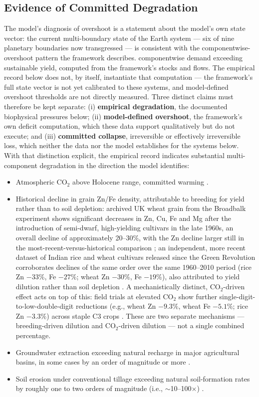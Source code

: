 \documentclass[twocolumn,10pt]{article}
\begin{document}
\subsection{Evidence of Committed Degradation}
\label{sec:evidence-of-committed-degradation}
The model's diagnosis of overshoot is a statement about the model's own state vector: the current multi-boundary state of the Earth system --- six of nine planetary boundaries now transgressed \cite{richardson2023} --- is consistent with the componentwise-overshoot pattern the framework describes. componentwise demand exceeding sustainable yield, computed from the framework's stocks and flows. The empirical record below does not, by itself, instantiate that computation --- the framework's full state vector is not yet calibrated to these systems, and model-defined overshoot thresholds are not directly measured. Three distinct claims must therefore be kept separate: (i) \textbf{empirical degradation}, the documented biophysical pressures below; (ii) \textbf{model-defined overshoot}, the framework's own deficit computation, which these data support qualitatively but do not execute; and (iii) \textbf{committed collapse}, irreversible or effectively irreversible loss, which neither the data nor the model establishes for the systems below. With that distinction explicit, the empirical record indicates substantial multi-component degradation in the direction the model identifies:
\begin{itemize}
\item Atmospheric CO\(_2\) above Holocene range, committed warming \cite{ipcc2021}.
\item Historical decline in grain Zn/Fe density, attributable to breeding for yield rather than to soil depletion: archived UK wheat grain from the Broadbalk experiment shows significant decreases in Zn, Cu, Fe and Mg after the introduction of semi-dwarf, high-yielding cultivars in the late 1960s, an overall decline of approximately 20--30\%, with the Zn decline larger still in the most-recent-versus-historical comparison \cite{fan2008}; an independent, more recent dataset of Indian rice and wheat cultivars released since the Green Revolution corroborates declines of the same order over the same 1960--2010 period (rice Zn $-33\%$, Fe $-27\%$; wheat Zn $-30\%$, Fe $-19\%$), also attributed to yield dilution rather than soil depletion \cite{debnath2023}. A mechanistically distinct, CO\(_2\)-driven effect acts on top of this: field trials at elevated CO\(_2\) show further single-digit-to-low-double-digit reductions (e.g., wheat Zn $-9.3\%$, wheat Fe $-5.1\%$; rice Zn $-3.3\%$) across staple C3 crops \cite{myers2014}. These are two separate mechanisms — breeding-driven dilution and CO\(_2\)-driven dilution — not a single combined percentage.
\item Groundwater extraction exceeding natural recharge in major agricultural basins, in some cases by an order of magnitude or more \cite{famiglietti2014,rodell2018}.
\item Soil erosion under conventional tillage exceeding natural soil-formation rates by roughly one to two orders of magnitude (i.e., $\sim$10--100$\times$) \cite{montgomery2007}.
\end{itemize}
\end{document}
